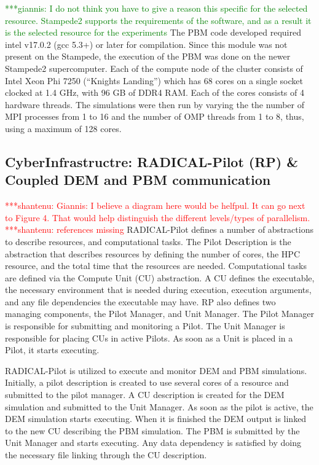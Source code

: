 \documentclass[preprint,11pt,authoryear]{elsarticle}
\newcommand{\jhanote}[1]{ {\textcolor{red} { ***shantenu: #1 }}}
\newcommand{\gpnote}[1]{{\textcolor{green} {***giannis: #1}}}
\newcommand{\jhanote}[1]{ {\textcolor{red} { ***shantenu: #1 }}}
\newcommand{\gpnote}[1]{}
\begin{document}
\gpnote{I do not think you have to
give a reason this specific for the selected resource. Stampede2 supports the requirements of the
software, and as a result it is the selected resource for the experiments} The PBM code developed
required intel v17.0.2 (gcc 5.3+)  or later for compilation. Since this module
was not present on the Stampede, the execution of the PBM was done on the
newer Stampede2 supercomputer. Each of the compute node of the cluster
consists of Intel Xeon Phi 7250 (\textquotedblleft Knights
Landing\textquotedblright) which has 68 cores on a single socket clocked at
1.4 GHz, with 96 GB of DDR4 RAM. Each of the cores consists of 4 hardware
threads. The simulations were then run by varying the the number of MPI
processes from 1 to 16 and the number of OMP threads from 1 to 8, thus, using
a maximum of 128 cores.

\subsection{CyberInfrastructre: RADICAL-Pilot (RP) \& Coupled DEM and PBM communication}
\label{sec:RPandCommunications}

\jhanote{Giannis: I believe a diagram here would be helfpul. It can go next to Figure 4. That would help distinguish the different levels/types of parallelism.}\jhanote{references missing}
RADICAL-Pilot defines a number of abstractions to describe resources, and
computational tasks. The Pilot Description is the abstraction that describes
resources by defining the number of cores, the HPC resource, and the total time that 
the resources are needed. Computational tasks are defined via the Compute Unit 
(CU) abstraction. A CU defines the executable, the necessary
environment that is needed during execution, execution arguments, and any file
dependencies the executable may have. RP also defines two managing components,
the Pilot Manager, and Unit Manager. The Pilot Manager is responsible for
submitting and monitoring a Pilot. The Unit Manager is responsible for
placing CUs in active Pilots. As soon as a Unit is placed in a Pilot, it starts
executing.

RADICAL-Pilot is utilized to execute and monitor DEM and PBM simulations.
Initially, a pilot description is created to use several cores of a resource
and submitted to the pilot manager. A CU description is created for the DEM
simulation and submitted to the Unit Manager. As soon as the pilot is active,
the DEM simulation starts executing. When it is finished the DEM output is linked to 
the new CU describing the PBM
simulation. The PBM is submitted by the Unit Manager and starts executing. Any data
dependency is satisfied by doing the necessary file linking through the CU
description.
\end{document}
